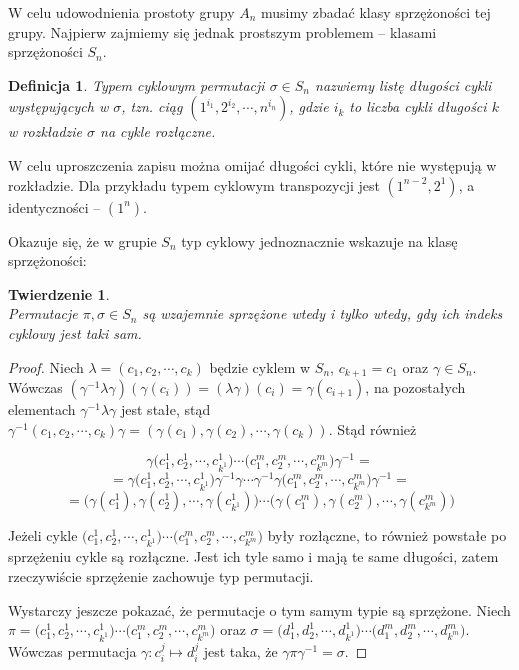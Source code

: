 \documentclass[licencjacka]{pracamgr}
\newtheorem{deff}{Definicja}[section]
\newtheorem{thh}{Twierdzenie}[section]
\begin{document}
W celu udowodnienia prostoty grupy $A_n$ musimy zbadać klasy sprzężoności tej grupy.
Najpierw zajmiemy się jednak prostszym problemem -- klasami sprzężoności $S_n$.

\begin{deff}
	\emph{Typem cyklowym} permutacji $\sigma \in S_n$ nazwiemy listę długości cykli występujących w $\sigma$,
	tzn. ciąg $(1^{i_1}, 2^{i_2}, \cdots, n^{i_n})$,
	gdzie $i_k$ to liczba cykli długości $k$ w rozkładzie $\sigma$ na cykle rozłączne.
\end{deff}
W celu uproszczenia zapisu można omijać długości cykli, które nie występują w rozkładzie.
Dla przykładu typem cyklowym transpozycji jest $(1^{n-2}, 2^1)$, a identyczności -- $(1^n)$.

Okazuje się, że w grupie $S_n$ typ cyklowy jednoznacznie wskazuje na klasę sprzężoności:

\begin{thh} $ $ \\
	Permutacje $\pi, \sigma \in S_n$ są wzajemnie sprzężone wtedy i tylko wtedy, gdy ich indeks cyklowy jest taki sam.
\end{thh}
\begin{proof}
	Niech $\lambda = (c_1, c_2, \cdots, c_k)$ będzie cyklem w $S_n$, $c_{k+1} = c_1$ oraz $\gamma \in S_n$.
	Wówczas $(\gamma^{-1} \lambda \gamma)(\gamma(c_i)) = (\lambda \gamma)(c_i) = \gamma(c_{i+1})$,
	na pozostałych elementach $\gamma^{-1} \lambda \gamma$ jest stałe, 
	stąd $\gamma^{-1} (c_1, c_2, \cdots, c_k) \gamma = (\gamma(c_1), \gamma(c_2), \cdots, \gamma(c_k))$.
	Stąd również 

		$$\gamma \Big(c_1^1, c_2^1, \cdots, c_{k^1}^1\Big) \cdots \Big(c_1^m, c_2^m, \cdots, c_{k^m}^m \Big) \gamma^{-1} = $$
		$$ = \gamma \Big(c_1^1, c_2^1, \cdots, c_{k^1}^1\Big) \gamma^{-1} \gamma  \cdots \gamma ^{-1} \gamma \Big(c_1^m, c_2^m, \cdots, c_{k^m}^m\Big) \gamma^{-1} = $$
		$$ = \Big(\gamma (c_1^1), \gamma (c_2^1), \cdots, \gamma (c_{k^1}^1)\Big) \cdots \Big(\gamma (c_1^m), \gamma (c_2^m), \cdots, \gamma (c_{k^m}^m)\Big)$$

	Jeżeli cykle $\Big(c_1^1, c_2^1, \cdots, c_{k^1}^1\Big) \cdots \Big(c_1^m, c_2^m, \cdots, c_{k^m}^m \Big)$ były rozłączne,
	to również powstałe po sprzężeniu cykle są rozłączne.
	Jest ich tyle samo i mają te same długości, zatem rzeczywiście sprzężenie zachowuje typ permutacji.

	Wystarczy jeszcze pokazać, że permutacje o tym samym typie są sprzężone.
	Niech $\pi =    \Big(c_1^1, c_2^1, \cdots, c_{k^1}^1\Big) \cdots \Big(c_1^m, c_2^m, \cdots, c_{k^m}^m \Big)$ 
	oraz  $\sigma = \Big(d_1^1, d_2^1, \cdots, d_{k^1}^1\Big) \cdots \Big(d_1^m, d_2^m, \cdots, d_{k^m}^m \Big)$.
	Wówczas permutacja $\gamma \colon c_i^j \mapsto d_i^j$ jest taka, że $\gamma \pi \gamma^{-1} = \sigma$.
\end{proof}
\end{document}
